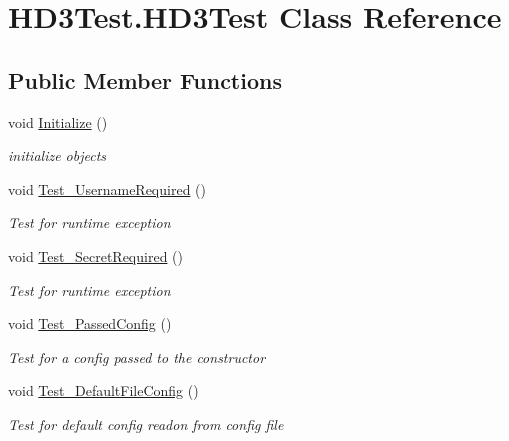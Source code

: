 \hypertarget{class_h_d3_test_1_1_h_d3_test}{\section{H\+D3\+Test.\+H\+D3\+Test Class Reference}
\label{class_h_d3_test_1_1_h_d3_test}
}


 


\subsection*{Public Member Functions}
\begin{DoxyCompactItemize}
\item 
void \hyperlink{class_h_d3_test_1_1_h_d3_test_ab1d1b4a628f55b77d47c42f62bd622f6}{Initialize} ()
\begin{DoxyCompactList}\small\item\em initialize objects \end{DoxyCompactList}\item 
void \hyperlink{class_h_d3_test_1_1_h_d3_test_ab21a137fee90227ef619edce13851094}{Test\+\_\+\+Username\+Required} ()
\begin{DoxyCompactList}\small\item\em Test for runtime exception \end{DoxyCompactList}\item 
void \hyperlink{class_h_d3_test_1_1_h_d3_test_a8864da2321f500b1eacda398787b4dde}{Test\+\_\+\+Secret\+Required} ()
\begin{DoxyCompactList}\small\item\em Test for runtime exception \end{DoxyCompactList}\item 
void \hyperlink{class_h_d3_test_1_1_h_d3_test_a7082b2e5c74517a50ef65c92fbe83337}{Test\+\_\+\+Passed\+Config} ()
\begin{DoxyCompactList}\small\item\em Test for a config passed to the constructor \end{DoxyCompactList}\item 
void \hyperlink{class_h_d3_test_1_1_h_d3_test_a9b9754745e23ba3fbd8f4009e5592140}{Test\+\_\+\+Default\+File\+Config} ()
\begin{DoxyCompactList}\small\item\em Test for default config readon from config file \end{DoxyCompactList}\item 

\end{DoxyCompactItemize}
